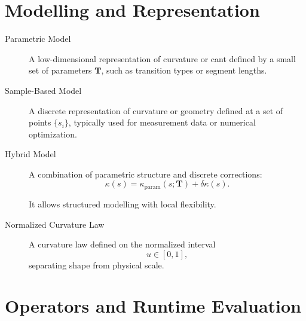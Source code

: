 \section*{Modelling and Representation}

\begin{description}

\item[Parametric Model]
A low-dimensional representation of curvature or cant defined by a small
set of parameters \(\mathbf{T}\), such as transition types or segment
lengths.

\item[Sample-Based Model]
A discrete representation of curvature or geometry defined at a set of
points \(\{s_i\}\), typically used for measurement data or numerical
optimization.

\item[Hybrid Model]
A combination of parametric structure and discrete corrections:
\[
\kappa(s)
=
\kappa_{\mathrm{param}}(s;\mathbf{T})
+
\delta\kappa(s).
\]

It allows structured modelling with local flexibility.

\item[Normalized Curvature Law]
A curvature law defined on the normalized interval
\[
u\in[0,1],
\]
separating shape from physical scale.

\end{description}

\section*{Operators and Runtime Evaluation}

